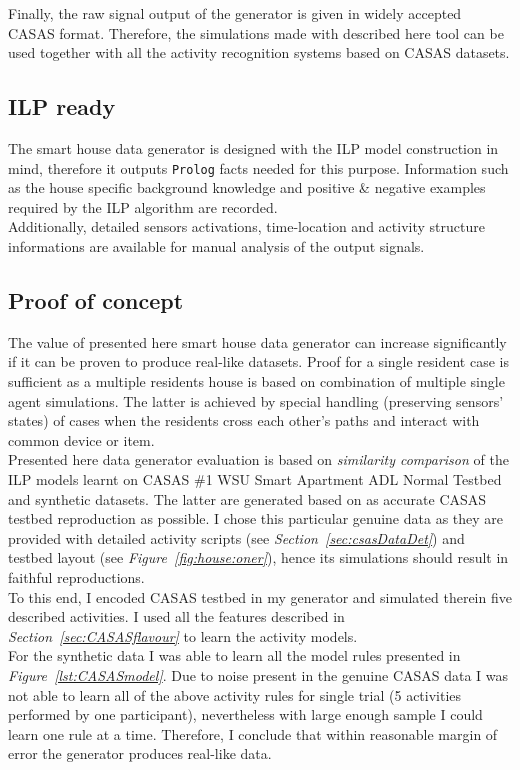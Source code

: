 \documentclass[10pt, a4paper, pdflatex, leqno, twoside, openright]{report}
\begin{document}
Finally, the raw signal output of the generator is given in widely accepted CASAS format. Therefore, the simulations made with described here tool can be used together with all the activity recognition systems based on CASAS datasets.

    \subsection{ILP ready}
The smart house data generator is designed with the ILP model construction in mind, therefore it outputs \texttt{Prolog} facts needed for this purpose. Information such as the house specific background knowledge and positive \& negative examples required by the ILP algorithm are recorded.\\
Additionally, detailed sensors activations, time-location and activity structure informations are available for manual analysis of the output signals.

    \subsection{Proof of concept}
The value of presented here smart house data generator can increase significantly if it can be proven to produce real-like datasets. Proof for a single resident case is sufficient as a multiple residents house is based on combination of multiple single agent simulations. The latter is achieved by special handling (preserving sensors' states) of cases when the residents cross each other's paths and interact with common device or item.\\

Presented here data generator evaluation is based on \emph{similarity comparison} of the ILP models learnt on CASAS \#1 WSU Smart Apartment ADL Normal Testbed and synthetic datasets. The latter are generated based on as accurate CASAS testbed reproduction as possible. I chose this particular genuine data as they are provided with detailed activity scripts (see \emph{Section~\ref{sec:csasDataDet}}) and testbed layout (see \emph{Figure~\ref{fig:house:oner}}), hence its simulations should result in faithful reproductions.\\

To this end, I encoded CASAS testbed in my generator and simulated therein five described activities. I used all the features described in \emph{Section~\ref{sec:CASASflavour}} to learn the activity models.\\
For the synthetic data I was able to learn all the model rules presented in \emph{Figure~\ref{lst:CASASmodel}}. Due to noise present in the genuine CASAS data I was not able to learn all of the above activity rules for single trial (5 activities performed by one participant), nevertheless with large enough sample I could learn one rule at a time. Therefore, I conclude that within reasonable margin of error the generator produces real-like data.
\end{document}
